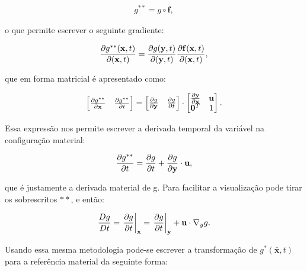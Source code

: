 \documentclass[tese_patricia]{subfiles}%
\begin{document}
\begin{align}
	g^{**} = g  \circ \mathbf{f},
\end{align}

\noindent o que permite escrever o seguinte gradiente:

\begin{align}
	\frac{\partial g^{**}(\mathbf{x},t)}{\partial (\mathbf{x},t)} = \frac{\partial g(\mathbf{y},t)}{\partial (\mathbf{y},t)} \frac{\partial \mathbf{f}(\mathbf{x},t)}{\partial (\mathbf{x},t)},
\end{align}

\noindent que em forma matricial é apresentado como:

\begin{align}
	\begin{bmatrix}
		\frac{\partial {g^{**}}}{\partial {\mathbf{x}}} & \frac{\partial {g^{**}}}{\partial t} \\
	\end{bmatrix}
	=
	\begin{bmatrix}
		\frac{\partial {g}}{\partial \mathbf{y}} & \frac{\partial {g}}{\partial t} 
	\end{bmatrix}
	\cdot
	\begin{bmatrix}
		\frac{\partial {\mathbf{y}}}{\partial {\mathbf{x}}} & \mathbf{u} \\
		\mathbf{0}^T & 1 \\
	\end{bmatrix} .
\end{align}

Essa expressão nos permite escrever a derivada temporal da variável na configuração material:

\begin{align}
	\frac{\partial g^{**}}{\partial t} = \frac{\partial g}{\partial t} + \frac{\partial g}{\partial \mathbf{y}} \cdot \mathbf{u}, 
\end{align}

\noindent que é justamente a derivada material de g. Para facilitar a visualização pode tirar os sobrescritos $**$, e então:

\begin{align}
	\frac{Dg}{Dt} = \left . \frac{\partial g}{\partial t} \right|_{\mathbf{x}} = \left . \frac{\partial g}{\partial t} \right|_{\mathbf{y}} + \mathbf{u} \cdot \nabla_y g. \label{eq:derMat}
\end{align}

Usando essa mesma metodologia pode-se escrever a transformação de $g^{*}(\bar{\mathbf{x}},t)$ para a referência material da seguinte forma:
\end{document}
